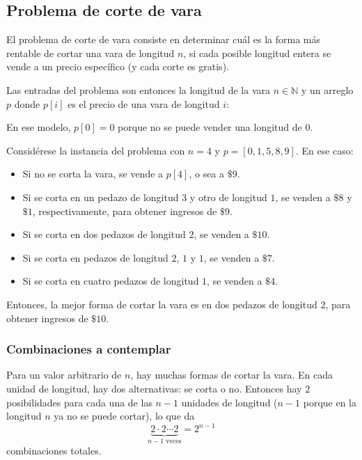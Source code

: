 \subsection{Problema de corte de vara}

El problema de corte de vara consiste en determinar cuál es la forma más rentable de cortar una vara de longitud \(n\), si cada posible longitud entera se vende a un precio específico (y cada corte es gratis).

Las entradas del problema son entonces la longitud de la vara \(n\in \mathbb{N}\) y un arreglo \(p\) donde \(p[i]\) es el precio de una vara de longitud \(i\):
\begin{especificacion}
\end{especificacion}
En ese modelo, \(p[0] = 0\) porque no se puede vender una longitud de \(0\).

Considérese la instancia del problema con \(n=4\) y \(p = [0, 1, 5, 8, 9]\). En ese caso:
\begin{itemize}
  \item Si no se corta la vara, se vende a \(p[4]\), o sea a \(\$9\).
  \item Si se corta en un pedazo de longitud \(3\) y otro de longitud \(1\), se venden a \(\$8\) y \(\$1\), respectivamente, para obtener ingresos de \(\$9\).
  \item Si se corta en dos pedazos de longitud \(2\), se venden a \(\$10\).
  \item Si se corta en pedazos de longitud \(2\), \(1\) y \(1\), se venden a \(\$7\).
  \item Si se corta en cuatro pedazos de longitud \(1\), se venden a \(\$4\).
\end{itemize}
Entonces, la mejor forma de cortar la vara es en dos pedazos de longitud \(2\), para obtener ingresos de \(\$10\).

\subsubsection{Combinaciones a contemplar}

Para un valor arbitrario de \(n\), hay muchas formas de cortar la vara. En cada unidad de longitud, hay dos alternativas: se corta o no. Entonces hay \(2\) posibilidades para cada una de las \(n-1\) unidades de longitud (\(n-1\) porque en la longitud \(n\) ya no se puede cortar), lo que da \[\underbrace{2\cdot2\cdots2}_{n-1 \text{ veces}} = 2^{n-1}\] combinaciones totales.

